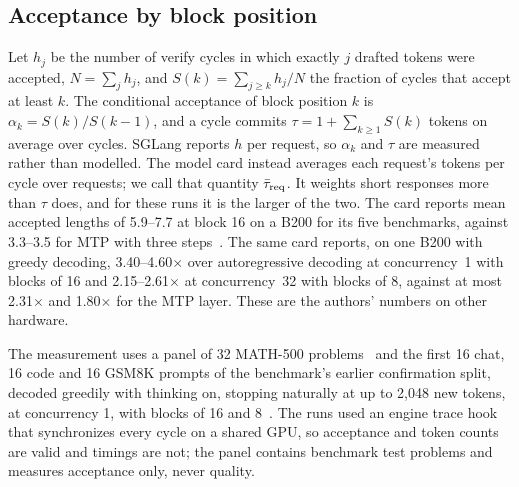 \subsection{Acceptance by block position}\label{app:drafter-acceptance}\label{sec:drafter-acceptance}
Let $h_j$ be the number of verify cycles in which exactly $j$ drafted tokens were accepted, $N=\sum_jh_j$, and $S(k)=\sum_{j\ge k}h_j/N$ the fraction of cycles that accept at least $k$. The conditional acceptance of block position $k$ is $\alpha_k=S(k)/S(k-1)$, and a cycle commits $\tau=1+\sum_{k\ge1}S(k)$ tokens on average over cycles. SGLang reports $h$ per request, so $\alpha_k$ and $\tau$ are measured rather than modelled. The model card instead averages each request's tokens per cycle over requests; we call that quantity $\bar\tau_{\rm req}$. It weights short responses more than $\tau$ does, and for these runs it is the larger of the two. The card reports mean accepted lengths of 5.9--7.7 at block 16 on a B200 for its five benchmarks, against 3.3--3.5 for MTP with three steps~\cite{dflash4bcard}. The same card reports, on one B200 with greedy decoding, 3.40--4.60$\times$ over autoregressive decoding at concurrency~1 with blocks of 16 and 2.15--2.61$\times$ at concurrency~32 with blocks of 8, against at most 2.31$\times$ and 1.80$\times$ for the MTP layer. These are the authors' numbers on other hardware.

The measurement uses a panel of 32 MATH-500 problems~\cite{hendrycksmath,lightman2024} and the first 16 chat, 16 code and 16 GSM8K prompts of the benchmark's earlier confirmation split, decoded greedily with thinking on, stopping naturally at up to 2,048 new tokens, at concurrency 1, with blocks of 16 and 8~. The runs used an engine trace hook that synchronizes every cycle on a shared GPU, so acceptance and token counts are valid and timings are not; the panel contains benchmark test problems and measures acceptance only, never quality.

